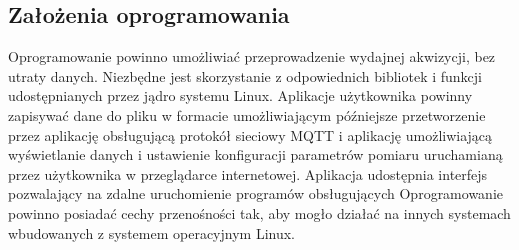 \subsection{Założenia oprogramowania}

Oprogramowanie powinno umożliwiać przeprowadzenie wydajnej akwizycji, bez utraty danych.
Niezbędne jest skorzystanie z odpowiednich bibliotek i funkcji udostępnianych przez jądro systemu Linux. Aplikacje użytkownika powinny zapisywać dane do pliku w formacie umożliwiającym późniejsze przetworzenie przez aplikację obsługującą protokół sieciowy MQTT i aplikację umożliwiającą wyświetlanie danych i ustawienie konfiguracji parametrów pomiaru uruchamianą przez użytkownika w przeglądarce internetowej. Aplikacja udostępnia interfejs pozwalający na zdalne uruchomienie programów obsługujących Oprogramowanie powinno posiadać cechy przenośności tak, aby mogło działać na innych systemach wbudowanych z systemem operacyjnym Linux.


